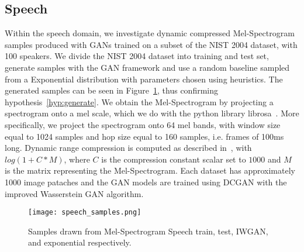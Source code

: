 \subsection{Speech}
Within the speech domain, we investigate dynamic compressed Mel-Spectrogram 
samples produced with GANs trained on a subset of the NIST 2004 dataset, with
100 speakers. We divide the NIST 2004 dataset into training and test set,
generate samples with the GAN framework and use a random baseline sampled from 
a Exponential distribution with parameters chosen using heuristics.
The generated samples can be seen in
Figure~\ref{fig:speech_samples}, thus confirming hypothesis~\ref{hyp:generate}.
We obtain the Mel-Spectrogram by projecting a
spectrogram onto a mel scale, which we do with the python library
librosa~\cite{mcfee2015librosa}. More specifically,  we project the spectrogram 
onto 64 mel bands,
with window size equal to 1024 samples and hop size equal to 160 samples, i.e.
frames of 100ms long. Dynamic range compression is computed as described 
in~\cite{lukic2016speaker}, with $log(1 + C*M)$, where $C$ is the compression 
constant scalar set to $1000$ and $M$ is the matrix representing the Mel-Spectrogram.
Each dataset has approximately 1000 image pataches and the GAN models are trained 
using DCGAN with the improved Wasserstein GAN algorithm.

\begin{figure}[!h]
  \begin{center}
  \texttt{[image: speech\_samples.png]}
  \caption{Samples drawn from Mel-Spectrogram Speech train, test,
IWGAN, and exponential respectively.}
  \label{fig:speech_samples}
  \end{center}
\end{figure}


